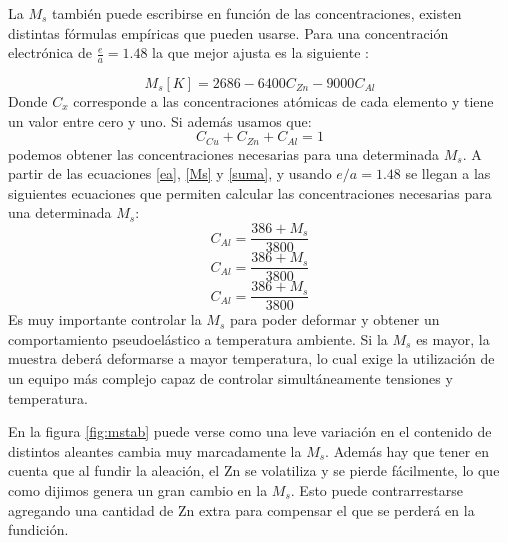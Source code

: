 \documentclass[a4paper,12pt,fleqn,twoside,openany]{book}
\begin{document}
La $M_{s}$ también puede escribirse en función de las concentraciones, existen 
distintas fórmulas empíricas que pueden usarse. Para una concentración electrónica de $\frac{e}{a}=1.48$ la que mejor ajusta es la siguiente \cite{pierre}:

\begin{equation}
M_s[K]=2686-6400C_{Zn}-9000C_{Al} \label{Ms} 
\end{equation}
Donde $C_x$ corresponde a las concentraciones atómicas de cada elemento y tiene un valor entre cero y uno. Si además usamos que:
\begin{equation}
C_{Cu}+C_{Zn}+C_{Al}=1 \label{suma}
\end{equation}
podemos obtener las concentraciones necesarias para una determinada $M_{s}$. A partir de las ecuaciones \ref{ea}, \ref{Ms} y \ref{suma}, y usando $e/a=1.48$ se llegan a las siguientes ecuaciones que permiten calcular las concentraciones necesarias para una determinada $M_s$:
\begin{equation}
C_{Al}=\frac{386+M_s}{3800} 
\end{equation}
\begin{equation}
C_{Al}=\frac{386+M_s}{3800} 
\end{equation}
\begin{equation}
C_{Al}=\frac{386+M_s}{3800}
\end{equation}
Es muy importante controlar la $M_s$ para poder deformar y obtener un comportamiento pseudoelástico a temperatura ambiente. Si la $M_{s}$ es mayor, la muestra deberá deformarse a mayor temperatura, lo 
cual exige la utilización de un equipo más complejo capaz de controlar simultáneamente tensiones y temperatura.



En la figura \ref{fig:mstab} puede verse como una leve variación en el contenido de distintos aleantes cambia muy marcadamente la $M_s$. Además hay que 
tener en cuenta que al fundir la aleación, el Zn se volatiliza y se pierde fácilmente, lo que como dijimos genera un gran cambio en la $M_s$. Esto 
puede contrarrestarse agregando una cantidad de Zn extra para compensar el que se perderá en la fundición.

\end{document}
